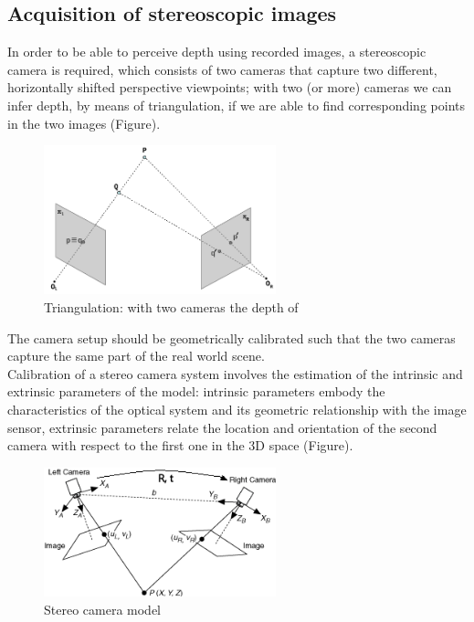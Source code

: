 \subsection{Acquisition of stereoscopic images}\label{sec:acquisition-of-stereoscopic-images}

In order to be able to perceive depth using recorded images, a stereoscopic camera is required,
which consists of two cameras that capture two different, horizontally shifted perspective
viewpoints; with two (or more) cameras we can infer depth, by means of triangulation, if we are able to find corresponding points in the two images (Figure).\\
\begin{figure}[h!]
\centering
\includegraphics[width=0.6\textwidth]{./img/correspondance.png}
\caption{\small{Triangulation: with two cameras the depth of }}
\label{fig:corr}
\end{figure}
 The camera setup should be geometrically
calibrated such that the two cameras capture the same part of the real world scene.\\
Calibration of a stereo camera system involves the estimation of the intrinsic and extrinsic parameters of the model: intrinsic parameters embody the characteristics of the optical system and its geometric relationship with the image sensor, extrinsic parameters relate the location and orientation of the second camera with respect to the first one in the 3D space (Figure).\\
\begin{figure}[h!]
\centering
\includegraphics[width=0.6\textwidth]{./img/stereo_system.png}
\caption{\small{Stereo camera model}}
\label{fig:rt}
\end{figure}

